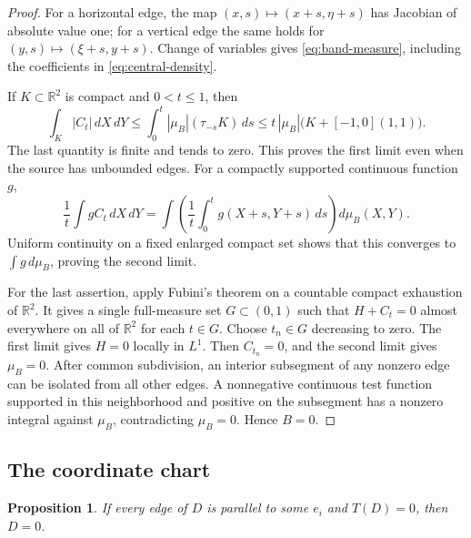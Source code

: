 \documentclass[11pt]{article}
\newtheorem{proposition}[theorem]{Proposition}
\theoremstyle{definition}
\theoremstyle{remark}
\newcommand{\R}{\mathbb R}
\begin{document}
\begin{proof}
For a horizontal edge, the map $(x,s)\mapsto(x+s,\eta+s)$ has
Jacobian of absolute value one; for a vertical edge the same holds for
$(y,s)\mapsto(\xi+s,y+s)$. Change of variables gives
\eqref{eq:band-measure}, including the coefficients in
\eqref{eq:central-density}.

If $K\subset\R^2$ is compact and $0<t\le1$, then
\[
 \int_K|C_t|\,dX\,dY
 \le \int_0^t|\mu_B|(\tau_{-s}K)\,ds
 \le t\,|\mu_B|\bigl(K+[-1,0](1,1)\bigr).
\]
The last quantity is finite and tends to zero. This proves the first
limit even when the source has unbounded edges. For a compactly
supported continuous function $g$,
\[
 \frac1t\int g C_t\,dX\,dY
 =\int\left(\frac1t\int_0^t g(X+s,Y+s)\,ds\right)d\mu_B(X,Y).
\]
Uniform continuity on a fixed enlarged compact set shows that this
converges to $\int g\,d\mu_B$, proving the second limit.

For the last assertion, apply Fubini's theorem on a countable compact
exhaustion of $\R^2$. It gives a single full-measure set
$G\subset(0,1)$ such that $H+C_t=0$ almost everywhere on all of
$\R^2$ for each $t\in G$. Choose $t_n\in G$ decreasing to zero.
The first limit gives $H=0$ locally in $L^1$.
Then $C_{t_n}=0$, and the second limit gives $\mu_B=0$.
After common subdivision, an interior subsegment of any nonzero edge
can be isolated from all other edges. A nonnegative continuous test
function supported in this neighborhood and positive on the subsegment
has a nonzero integral against $\mu_B$, contradicting $\mu_B=0$.
Hence $B=0$.
\end{proof}

\subsection{The coordinate chart}

\begin{proposition}\label{prop:coordinate}
If every edge of $D$ is parallel to some $e_i$ and $T(D)=0$, then $D=0$.
\end{proposition}
\end{document}
